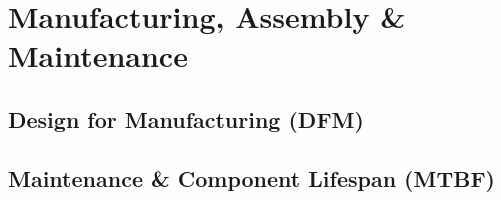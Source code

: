 ﻿\chapter{Manufacturing, Assembly \& Maintenance}
\label{ch:manufacturing}
\section{Design for Manufacturing (DFM)}
\section{Maintenance \& Component Lifespan (MTBF)}
